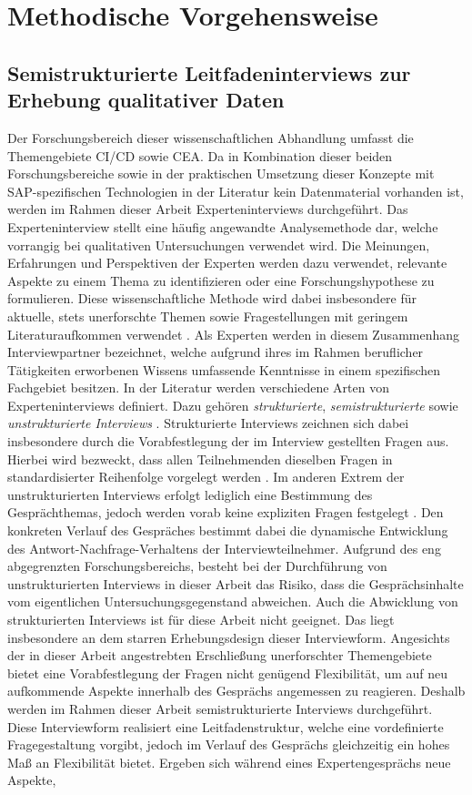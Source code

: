 \section{Methodische Vorgehensweise} 
\subsection{Semistrukturierte Leitfadeninterviews zur Erhebung qualitativer Daten}
Der Forschungsbereich dieser wissenschaftlichen Abhandlung umfasst die Themengebiete CI/CD sowie CEA. Da in Kombination dieser beiden Forschungsbereiche sowie in der praktischen Umsetzung dieser Konzepte mit SAP-spezifischen Technologien in der Literatur kein Datenmaterial vorhanden ist, werden im Rahmen dieser Arbeit Experteninterviews durchgeführt. 
Das Experteninterview stellt eine häufig angewandte Analysemethode dar, welche vorrangig bei qualitativen Untersuchungen verwendet wird. Die Meinungen, Erfahrungen und Perspektiven der Experten werden dazu verwendet, relevante Aspekte zu einem Thema zu identifizieren oder eine Forschungshypothese zu formulieren. Diese wissenschaftliche Methode wird dabei insbesondere für aktuelle, stets unerforschte Themen sowie Fragestellungen mit geringem Literaturaufkommen verwendet \cite[S. 33 ff.]{Kaiser.2021}. Als Experten werden in diesem Zusammenhang Interviewpartner bezeichnet, welche aufgrund ihres im Rahmen beruflicher Tätigkeiten erworbenen Wissens umfassende Kenntnisse in einem spezifischen Fachgebiet besitzen. In der Literatur werden verschiedene Arten von Experteninterviews definiert. Dazu gehören \textit{strukturierte}, \textit{semistrukturierte} sowie \textit{unstrukturierte Interviews} \cite[S. 84 ff.]{Kaiser.2021}. Strukturierte Interviews zeichnen sich dabei insbesondere durch die Vorabfestlegung der im Interview gestellten Fragen aus. Hierbei wird bezweckt, dass allen Teilnehmenden dieselben Fragen in standardisierter Reihenfolge vorgelegt werden \cite[S. 421 ff.]{Aghamanoukjan.2009}. Im anderen Extrem der unstrukturierten Interviews erfolgt lediglich eine Bestimmung des Gesprächthemas, jedoch werden vorab keine expliziten Fragen festgelegt \cite[S. 441 ff.]{Aghamanoukjan.2009}. Den konkreten Verlauf des Gespräches bestimmt dabei die dynamische Entwicklung des Antwort-Nachfrage-Verhaltens der Interviewteilnehmer. Aufgrund des eng abgegrenzten Forschungsbereichs, besteht bei der Durchführung von unstrukturierten Interviews in dieser Arbeit das Risiko, dass die Gesprächsinhalte vom eigentlichen Untersuchungsgegenstand abweichen. Auch die Abwicklung von strukturierten Interviews ist für diese Arbeit nicht geeignet. Das liegt insbesondere an dem starren Erhebungsdesign dieser Interviewform. Angesichts der in dieser Arbeit angestrebten Erschließung unerforschter Themengebiete bietet eine Vorabfestlegung der Fragen nicht genügend Flexibilität, um auf neu aufkommende Aspekte innerhalb des Gesprächs angemessen zu reagieren. Deshalb werden im Rahmen dieser Arbeit semistrukturierte Interviews durchgeführt. Diese Interviewform realisiert eine Leitfadenstruktur, welche eine vordefinierte Fragegestaltung vorgibt, jedoch im Verlauf des Gesprächs gleichzeitig ein hohes Maß an Flexibilität bietet. Ergeben sich während eines Expertengesprächs neue Aspekte, 